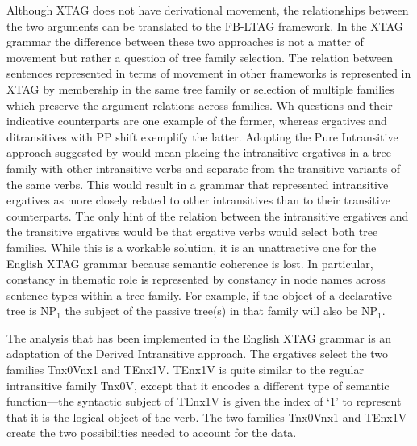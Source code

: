 Although XTAG does not have derivational movement, the relationships between
the two arguments can be translated to the FB-LTAG framework.  In the XTAG
grammar the difference between these two approaches is not a matter of movement
but rather a question of tree family selection.  The relation between sentences
represented in terms of movement in other frameworks is represented in XTAG by
membership in the same tree family or selection of multiple families which
preserve the argument relations across families. Wh-questions and their
indicative counterparts are one example of the former, whereas ergatives and
ditransitives with PP shift exemplify the latter.  Adopting the Pure
Intransitive approach suggested by
\cite{Napoli88} would mean placing the intransitive ergatives in a
tree family with other intransitive verbs and separate from the
transitive variants of the same verbs.  This would result in a grammar
that represented intransitive ergatives as more closely related to
other intransitives than to their transitive counterparts.  The only
hint of the relation between the intransitive ergatives and the
transitive ergatives would be that ergative verbs would select both
tree families. While this is a workable solution, it is an
unattractive one for the English XTAG grammar because semantic
coherence is lost.  In particular, constancy in thematic role is
represented by constancy in node names across sentence types within a
tree family. For example, if the object of a declarative tree is
NP$_{1}$ the subject of the passive tree(s) in that family will also
be NP$_{1}$.  

The analysis that has been implemented in the English XTAG grammar is
an adaptation of the Derived Intransitive approach.  The ergatives
select the two families Tnx0Vnx1 and TEnx1V.  TEnx1V is quite similar
to the regular intransitive family Tnx0V, except that it encodes a
different type of semantic function---the syntactic subject of TEnx1V
is given the index of `1' to represent that it is the logical object
of the verb.  The two families Tnx0Vnx1 and TEnx1V create the two
possibilities needed to account for the data.

